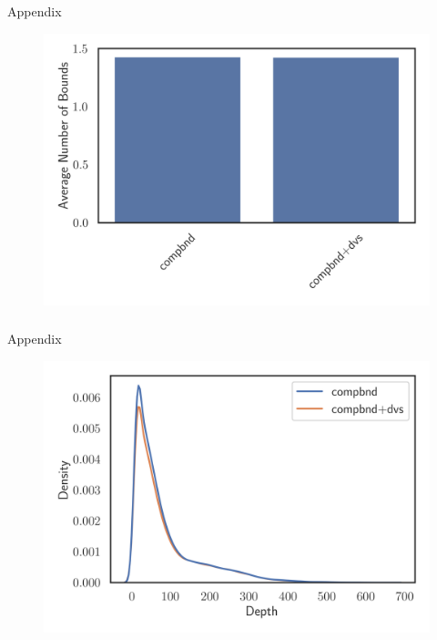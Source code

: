 \documentclass[compress,beamer,aspectratio=169,english,usenames,dvipsnames]{beamer}
\begin{document}
\begin{frame}
\frametitle{}
\huge Appendix
\centering
\begin{figure}
\includegraphics[height=0.85\textheight]{graphics/slides/bound_stats/avg_num_bounds.png}
\end{figure}
\end{frame}

\begin{frame}
\frametitle{}
\huge Appendix
\centering
\begin{figure}
\includegraphics[height=0.85\textheight]{graphics/slides/bound_stats/compbnd/depths_distribution.png}
\end{figure}
\end{frame}
\end{document}
